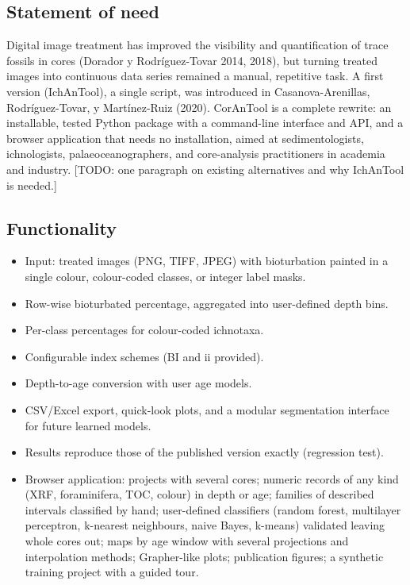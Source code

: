 \documentclass[
  10pt,
]{article}
\providecommand{\tightlist}{%
  \setlength{\itemsep}{0pt}\setlength{\parskip}{0pt}}
\begin{document}
\hypertarget{statement-of-need}{%
\subsection{Statement of need}\label{statement-of-need}}

Digital image treatment has improved the visibility and quantification
of trace fossils in cores (Dorador y Rodríguez-Tovar 2014, 2018), but
turning treated images into continuous data series remained a manual,
repetitive task. A first version (IchAnTool), a single script, was
introduced in Casanova-Arenillas, Rodríguez-Tovar, y Martínez-Ruiz
(2020). CorAnTool is a complete rewrite: an installable, tested Python
package with a command-line interface and API, and a browser application
that needs no installation, aimed at sedimentologists, ichnologists,
palaeoceanographers, and core-analysis practitioners in academia and
industry. {[}TODO: one paragraph on existing alternatives and why
IchAnTool is needed.{]}

\hypertarget{functionality}{%
\subsection{Functionality}\label{functionality}}

\begin{itemize}
\tightlist
\item
  Input: treated images (PNG, TIFF, JPEG) with bioturbation painted in a
  single colour, colour-coded classes, or integer label masks.
\item
  Row-wise bioturbated percentage, aggregated into user-defined depth
  bins.
\item
  Per-class percentages for colour-coded ichnotaxa.
\item
  Configurable index schemes (BI and ii provided).
\item
  Depth-to-age conversion with user age models.
\item
  CSV/Excel export, quick-look plots, and a modular segmentation
  interface for future learned models.
\item
  Results reproduce those of the published version exactly (regression
  test).
\item
  Browser application: projects with several cores; numeric records of
  any kind (XRF, foraminifera, TOC, colour) in depth or age; families of
  described intervals classified by hand; user-defined classifiers
  (random forest, multilayer perceptron, k-nearest neighbours, naive
  Bayes, k-means) validated leaving whole cores out; maps by age window
  with several projections and interpolation methods; Grapher-like
  plots; publication figures; a synthetic training project with a guided
  tour.
\end{itemize}
\end{document}
